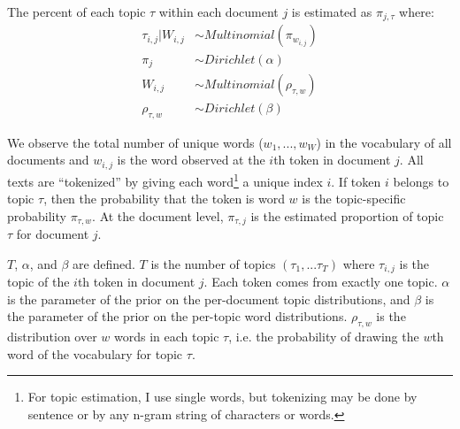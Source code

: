 The percent of each topic $\tau$ within each document $j$ is estimated as $\pi_{j, \tau}$ where:
\begin{align*}
\tau_{i, j} | W_{i, j} &\sim Multinomial(\pi_{w_{i, j} })\\
\pi_{j} &\sim Dirichlet(\alpha) \\ %
W_{i, j} &\sim Multinomial(\rho_{\tau,w})\\ %
\rho_{\tau,w} &\sim Dirichlet(\beta) 
\end{align*}

We observe the total number of unique words ($w_1,...,w_W$) in the vocabulary of all documents and $w_{i, j}$ is the word observed at the $i$th token in document $j$. All texts are ``tokenized'' by giving each word\footnote{For topic estimation, I use single words, but tokenizing may be done by sentence or by any n-gram string of characters or words.} a unique index $i$. If token $i$ belongs to topic $\tau$, then the probability that the token is word $w$ is the topic-specific probability $\pi_{\tau, w}$. At the document level, $\pi_{\tau, j}$ %
is the estimated proportion of topic $\tau$ for document $j$. %

$T$, $\alpha$, and $\beta$ are defined. 
$T$ is the number of topics $(\tau_1,...\tau_T)$ where $\tau_{i, j}$ is the topic of the $i$th token in document $j$. Each token comes from exactly one topic.
$\alpha$ is the parameter of the prior on the per-document topic distributions, and
$\beta$ is the parameter of the prior on the per-topic word distributions. 
$\rho_{\tau, w}$ %
is the distribution over $w$ words in each topic $\tau$, i.e. the probability of drawing the $w$th word of the vocabulary for topic $\tau$.


